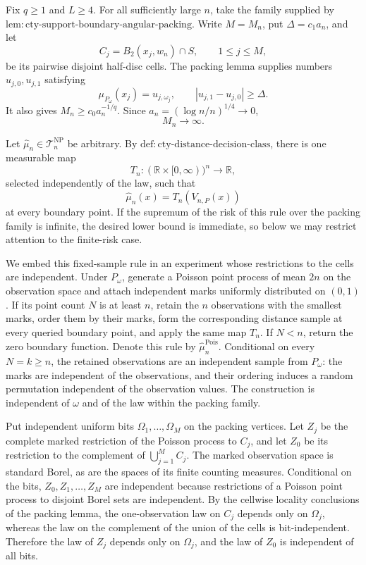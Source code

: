 Fix \(q\geq1\) and \(L\geq4\).  For all sufficiently large \(n\), take the family supplied by \(\mathrm{lem:cty\text{-}support\text{-}boundary\text{-}angular\text{-}packing}\).  Write \(M=M_n\), put \(\Delta=c_1a_n\), and let
\[
 C_j=B_2(x_j,w_n)\cap S,\qquad 1\leq j\leq M,
\]
be its pairwise disjoint half-disc cells.  The packing lemma supplies numbers \(u_{j,0},u_{j,1}\) satisfying
\[
 \mu_{P_\omega}(x_j)=u_{j,\omega_j},
 \qquad |u_{j,1}-u_{j,0}|\geq\Delta.
\]
It also gives \(M_n\geq c_0a_n^{-1/q}\).  Since \(a_n=(\log n/n)^{1/4}\to0\),
\[
 M_n\longrightarrow\infty.
\]

Let \(\widehat\mu_n\in\mathcal T_n^{\mathrm{NP}}\) be arbitrary.  By \(\mathrm{def:cty\text{-}distance\text{-}decision\text{-}class}\), there is one measurable map
\[
 T_n:(\mathbb R\times[0,\infty))^n\longrightarrow\mathbb R,
\]
selected independently of the law, such that
\[
 \widehat\mu_n(x)=T_n(V_{n,P}(x))
\]
at every boundary point.  If the supremum of the risk of this rule over the packing family is infinite, the desired lower bound is immediate, so below we may restrict attention to the finite-risk case.

We embed this fixed-sample rule in an experiment whose restrictions to the cells are independent.  Under \(P_\omega\), generate a Poisson point process of mean \(2n\) on the observation space and attach independent marks uniformly distributed on \((0,1)\).  If its point count \(N\) is at least \(n\), retain the \(n\) observations with the smallest marks, order them by their marks, form the corresponding distance sample at every queried boundary point, and apply the same map \(T_n\).  If \(N<n\), return the zero boundary function.  Denote this rule by \(\widehat\mu_n^{\mathrm{Pois}}\).  Conditional on every \(N=k\geq n\), the retained observations are an independent sample from \(P_\omega\): the marks are independent of the observations, and their ordering induces a random permutation independent of the observation values.  The construction is independent of \(\omega\) and of the law within the packing family.

Put independent uniform bits \(\Omega_1,\ldots,\Omega_M\) on the packing vertices.  Let \(Z_j\) be the complete marked restriction of the Poisson process to \(C_j\), and let \(Z_0\) be its restriction to the complement of \(\bigcup_{j=1}^M C_j\).  The marked observation space is standard Borel, as are the spaces of its finite counting measures.  Conditional on the bits, \(Z_0,Z_1,\ldots,Z_M\) are independent because restrictions of a Poisson point process to disjoint Borel sets are independent.  By the cellwise locality conclusions of the packing lemma, the one-observation law on \(C_j\) depends only on \(\Omega_j\), whereas the law on the complement of the union of the cells is bit-independent.  Therefore the law of \(Z_j\) depends only on \(\Omega_j\), and the law of \(Z_0\) is independent of all bits.

